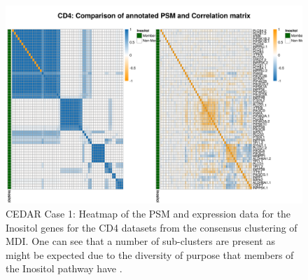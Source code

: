 \documentclass[14pt]{extarticle} %
\begin{document}
	\begin{figure}
		\centering
		\includegraphics[scale=0.75]{Images/Biology_data/Set_250/All_datasets/Heatmaps/KEGG_INOSITOL_PHOSPHATE_METABOLISM/CD4_comp_psm_corr.png}
		\caption{CEDAR Case 1: Heatmap of the PSM and expression data for the Inositol genes for the CD4 datasets from the consensus clustering of MDI. One can see that a number of sub-clusters are present as might be expected due to the diversity of purpose that members of the Inositol pathway have \citep{monserrate2010inositol}.}
		\label{fig:results:cedar_1:mdi_cd4_inostiol_psm_cor}
	\end{figure}
\end{document}
